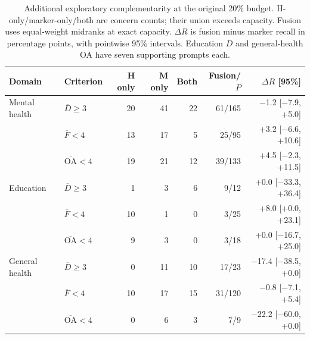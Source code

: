\begin{table}[htbp]
\centering\small
\caption{Additional exploratory complementarity at the original 20\% budget. H-only/marker-only/both are concern counts; their union exceeds capacity. Fusion uses equal-weight midranks at exact capacity. $\Delta R$ is fusion minus marker recall in percentage points, with pointwise 95\% intervals. Education $D$ and general-health OA have seven supporting prompts each.}
\label{tab:complementarity}
\begin{tabular}{llrrrrr}
\toprule
Domain & Criterion & H only & M only & Both & Fusion/$P$ & $\Delta R$ [95\%] \\
\midrule
Mental health & $\overline D\geq3$ & 20 & 41 & 22 & 61/165 & \ensuremath{-}1.2 [\ensuremath{-}7.9, +5.0] \\
 & $\overline F<4$ & 13 & 17 & 5 & 25/95 & +3.2 [\ensuremath{-}6.6, +10.6] \\
 & $\overline{\mathrm{OA}}<4$ & 19 & 21 & 12 & 39/133 & +4.5 [\ensuremath{-}2.3, +11.5] \\
Education & $\overline D\geq3$ & 1 & 3 & 6 & 9/12 & +0.0 [\ensuremath{-}33.3, +36.4] \\
 & $\overline F<4$ & 10 & 1 & 0 & 3/25 & +8.0 [+0.0, +23.1] \\
 & $\overline{\mathrm{OA}}<4$ & 9 & 3 & 0 & 3/18 & +0.0 [\ensuremath{-}16.7, +25.0] \\
General health & $\overline D\geq3$ & 0 & 11 & 10 & 17/23 & \ensuremath{-}17.4 [\ensuremath{-}38.5, +0.0] \\
 & $\overline F<4$ & 10 & 17 & 15 & 31/120 & \ensuremath{-}0.8 [\ensuremath{-}7.1, +5.4] \\
 & $\overline{\mathrm{OA}}<4$ & 0 & 6 & 3 & 7/9 & \ensuremath{-}22.2 [\ensuremath{-}60.0, +0.0] \\
\bottomrule
\end{tabular}
\end{table}
